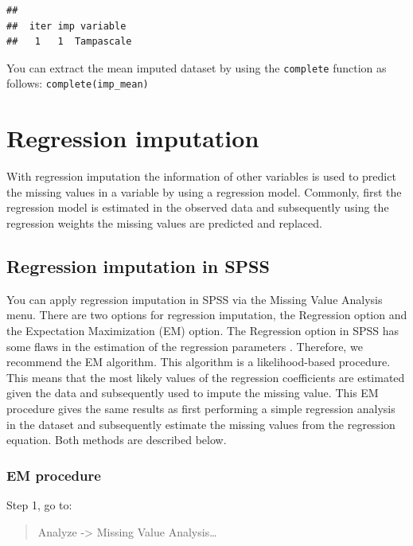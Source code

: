 \documentclass[
]{book}
\begin{document}
\begin{verbatim}
## 
##  iter imp variable
##   1   1  Tampascale
\end{verbatim}

You can extract the mean imputed dataset by using the \texttt{complete} function as follows: \texttt{complete(imp\_mean)}

\hypertarget{regression-imputation}{%
\section{Regression imputation}\label{regression-imputation}}

With regression imputation the information of other variables is used to predict the missing values in a variable by using a regression model. Commonly, first the regression model is estimated in the observed data and subsequently using the regression weights the missing values are predicted and replaced.

\hypertarget{regression-imputation-in-spss}{%
\subsection{Regression imputation in SPSS}\label{regression-imputation-in-spss}}

You can apply regression imputation in SPSS via the Missing Value Analysis menu. There are two options for regression imputation, the Regression option and the Expectation Maximization (EM) option. The Regression option in SPSS has some flaws in the estimation of the regression parameters \citep{hippel2004}. Therefore, we recommend the EM algorithm. This algorithm is a likelihood-based procedure. This means that the most likely values of the regression coefficients are estimated given the data and subsequently used to impute the missing value. This EM procedure gives the same results as first performing a simple regression analysis in the dataset and subsequently estimate the missing values from the regression equation. Both methods are described below.

\hypertarget{em-procedure}{%
\subsubsection{EM procedure}\label{em-procedure}}

Step 1, go to:

\begin{quote}
Analyze -\textgreater{} Missing Value Analysis\ldots{}
\end{quote}
\end{document}
